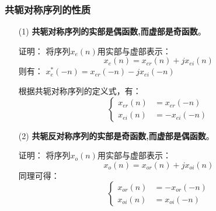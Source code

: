 \documentclass[notheorems,compress,mathserif,table]{beamer}
\begin{document}
\begin{frame}\frametitle{共轭对称序列的性质}%

\begin{enumerate}
\item [(1)] \textbf{共轭对称序列的实部是偶函数,而虚部是奇函数}。
\par 证明：
将序列$x_{e}(n)$用实部与虚部表示：%
$$x_{e}(n) = x_{er}(n) + jx_{ei}(n)$$
则有： \quad\quad\quad\quad
$x_{e}^{*}(-n) = x_{er}(-n) - jx_{ei}(-n)$
\par 根据共轭对称序列的定义式，有：
\begin{equation*}
\left\{ \begin{aligned}
x_{er}(n) &= x_{er}(-n)\\
x_{ei}(n) &= -x_{ei}(-n)
\end{aligned} \right.
\end{equation*}
\pause
\item [(2)]  \textbf{共轭反对称序列的实部是奇函数,而虚部是偶函数}。
\par 证明：
将序列$x_{o}(n)$用实部与虚部表示：
$$x_{o}(n) = x_{or}(n) + jx_{oi}(n)$$\vspace{-0.5cm}
同理可得：
\begin{equation*}
\left\{ \begin{aligned}
x_{or}(n) &= -x_{or}(-n)\\
x_{oi}(n) &= x_{oi}(-n)
\end{aligned} \right.
\end{equation*}
\end{enumerate}
\end{frame}
\end{document}
